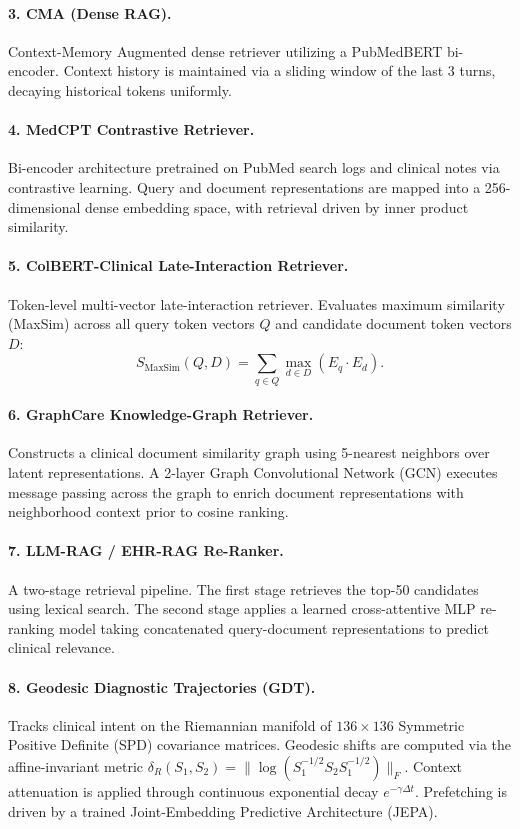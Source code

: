 \documentclass[11pt]{article}
\begin{document}
\paragraph{3. CMA (Dense RAG).}
Context-Memory Augmented dense retriever utilizing a PubMedBERT bi-encoder. Context history is maintained via a sliding window of the last 3 turns, decaying historical tokens uniformly.

\paragraph{4. MedCPT Contrastive Retriever.}
Bi-encoder architecture pretrained on PubMed search logs and clinical notes via contrastive learning. Query and document representations are mapped into a 256-dimensional dense embedding space, with retrieval driven by inner product similarity.

\paragraph{5. ColBERT-Clinical Late-Interaction Retriever.}
Token-level multi-vector late-interaction retriever. Evaluates maximum similarity (MaxSim) across all query token vectors $Q$ and candidate document token vectors $D$:
\begin{equation}
  S_{\text{MaxSim}}(Q, D) = \sum_{q \in Q} \max_{d \in D} (E_q \cdot E_d).
\end{equation}

\paragraph{6. GraphCare Knowledge-Graph Retriever.}
Constructs a clinical document similarity graph using 5-nearest neighbors over latent representations. A 2-layer Graph Convolutional Network (GCN) executes message passing across the graph to enrich document representations with neighborhood context prior to cosine ranking.

\paragraph{7. LLM-RAG / EHR-RAG Re-Ranker.}
A two-stage retrieval pipeline. The first stage retrieves the top-50 candidates using lexical search. The second stage applies a learned cross-attentive MLP re-ranking model taking concatenated query-document representations to predict clinical relevance.

\paragraph{8. Geodesic Diagnostic Trajectories (GDT).}
Tracks clinical intent on the Riemannian manifold of $136 \times 136$ Symmetric Positive Definite (SPD) covariance matrices. Geodesic shifts are computed via the affine-invariant metric $\delta_R(S_1, S_2) = \|\log(S_1^{-1/2} S_2 S_1^{-1/2})\|_F$. Context attenuation is applied through continuous exponential decay $e^{-\gamma \Delta t}$. Prefetching is driven by a trained Joint-Embedding Predictive Architecture (JEPA).
\end{document}
